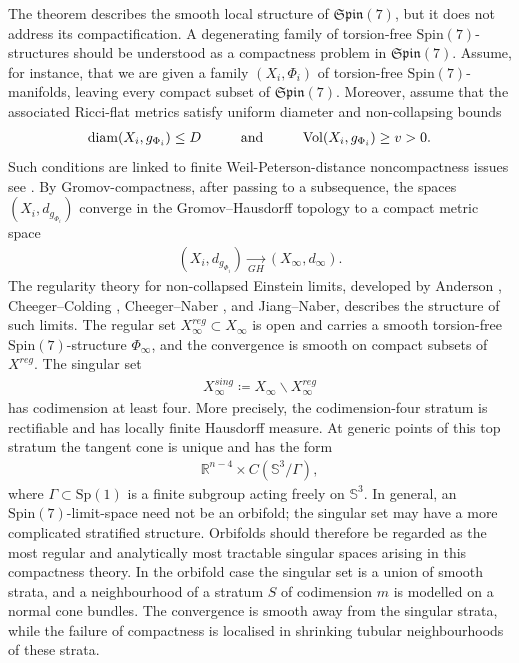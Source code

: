 \documentclass[psamsfonts]{amsart}
\theoremstyle{plain}
\theoremstyle{definition}{
\newtheorem{defi}{Definition}[section]
\newtheorem{ass}{Assumption}
\newtheorem*{nota}{Notation}}
\theoremstyle{remark}{
\newtheorem{rem}{Remark}
\newtheorem{ex}{Example}}
\theoremstyle{plain}{
\newtheorem{thm}{Theorem}[section]
\newtheorem{lem}{Lemma}[section]
\newtheorem{cor}{Corollary}[section]
\newtheorem{prop}{Proposition}[section]
\newtheorem{con}{Conjecture}[section]}
\newcommand{\m}[1]{{\mathrm{#1}}}
\newcommand{\und}[1]{\hspace{#1}\text{and}\hspace{#1}}
\begin{document}
The theorem describes the smooth local structure of $\mathfrak{Spin}(7)$, but it does not address its compactification. A degenerating family of torsion-free $\m{Spin}(7)$-structures should be understood as a compactness problem in $\mathfrak{Spin}(7)$. Assume, for instance, that we are given a family $(X_i,\Phi_i)$ of torsion-free $\m{Spin}(7)$-manifolds, leaving every compact subset of $\mathfrak{Spin}(7)$. Moreover, assume that the associated Ricci-flat metrics satisfy uniform diameter and non-collapsing bounds
\begin{align*}
    \m{diam}(X_i,g_{\Phi_i})\leq D
    \und{1.0cm}
    \m{Vol}(X_i,g_{\Phi_i})\geq v>0.
\end{align*}
Such conditions are linked to finite Weil-Peterson-distance noncompactness issues see \cite{Langlais_2025}. By Gromov-compactness, after passing to a subsequence, the spaces $(X_i,d_{g_{\Phi_i}})$ converge in the Gromov--Hausdorff topology to a compact metric space
\begin{align*}
    (X_i,d_{g_{\Phi_i}})\xrightarrow[GH]{}(X_\infty,d_\infty).
\end{align*}
The regularity theory for non-collapsed Einstein limits, developed by Anderson \cite{anderson1990convergence}, Cheeger--Colding \cite{cheeger1986collapsing}, Cheeger--Naber \cite{cheeger1990collapsing}, and Jiang--Naber\cite{jiang2020l2curvatureboundsmanifolds}, describes the structure of such limits. The regular set $X^{reg}_\infty\subset X_\infty$ is open and carries a smooth torsion-free $\m{Spin}(7)$-structure $\Phi_\infty$, and the convergence is smooth on compact subsets of $X^{reg}$. The singular set
\begin{align*}
    X^{sing}_\infty\coloneqq X_\infty\backslash X^{reg}_\infty
\end{align*}
has codimension at least four. More precisely, the codimension-four stratum is rectifiable and has locally finite Hausdorff measure. At generic points of this top stratum the tangent cone is unique and has the form
\begin{align*}
    \mathbb{R}^{n-4}\times C(\mathbb{S}^3/\Gamma),
\end{align*}
where $\Gamma\subset \m{Sp}(1)$ is a finite subgroup acting freely on $\mathbb{S}^3$. In general, an $\m{Spin}(7)$-limit-space need not be an orbifold; the singular set may have a more complicated stratified structure. Orbifolds should therefore be regarded as the most regular and analytically most tractable singular spaces arising in this compactness theory. In the orbifold case the singular set is a union of smooth strata, and a neighbourhood of a stratum $S$ of codimension $m$ is modelled on a normal cone bundles. The convergence is smooth away from the singular strata, while the failure of compactness is localised in shrinking tubular neighbourhoods of these strata.\\
\end{document}
